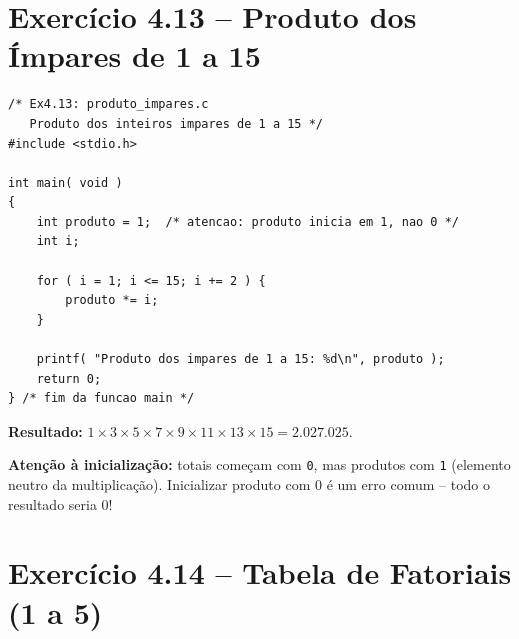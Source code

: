 \documentclass[12pt,a4paper]{article}
\begin{document}
\section{Exercício 4.13 -- Produto dos Ímpares de 1 a 15}

\begin{respostabox}
\begin{lstlisting}
/* Ex4.13: produto_impares.c
   Produto dos inteiros impares de 1 a 15 */
#include <stdio.h>

int main( void )
{
    int produto = 1;  /* atencao: produto inicia em 1, nao 0 */
    int i;

    for ( i = 1; i <= 15; i += 2 ) {
        produto *= i;
    }

    printf( "Produto dos impares de 1 a 15: %d\n", produto );
    return 0;
} /* fim da funcao main */
\end{lstlisting}

\textbf{Resultado:} $1 \times 3 \times 5 \times 7 \times 9 \times 11 \times 13 \times 15
= 2.027.025$.

\begin{boaprática}
  \textbf{Atenção à inicialização:} totais começam com \texttt{0}, mas produtos
  com \texttt{1} (elemento neutro da multiplicação). Inicializar produto com 0
  é um erro comum -- todo o resultado seria 0!
\end{boaprática}
\end{respostabox}

\newpage

\section{Exercício 4.14 -- Tabela de Fatoriais (1 a 5)}
\end{document}

